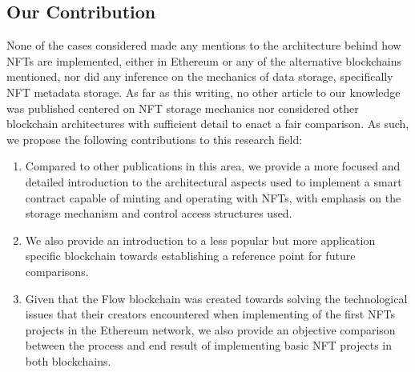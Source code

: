 \documentclass[../main.tex]{subfiles}
\begin{document}
\subsection{Our Contribution}
None of the cases considered made any mentions to the architecture behind how NFTs are implemented, either in Ethereum or any of the alternative blockchains mentioned, nor did any inference on the mechanics of data storage, specifically NFT metadata storage. As far as this writing, no other article to our knowledge was published centered on NFT storage mechanics nor considered other blockchain architectures with sufficient detail to enact a fair comparison. As such, we propose the following contributions to this research field:
\begin{enumerate}
    \item{Compared to other publications in this area, we provide a more focused and detailed introduction to the architectural aspects used to implement a smart contract capable of minting and operating with NFTs, with emphasis on the storage mechanism and control access structures used.}
    \item {We also provide an introduction to a less popular but more application specific blockchain towards establishing a reference point for future comparisons.}
    \item {Given that the Flow blockchain was created towards solving the technological issues that their creators encountered when implementing of the first NFTs projects in the Ethereum network, we also provide an objective comparison between the process and end result of implementing basic NFT projects in both blockchains.}
\end{enumerate}
\end{document}
